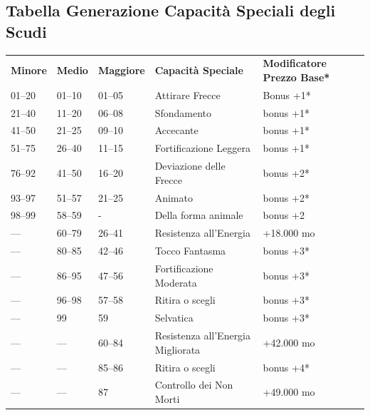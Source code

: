 \documentclass[a4paper,11pt,twoside,openany]{book}
\begin{document}
\subsection{Tabella Generazione Capacità Speciali degli Scudi}

\label{tabella-generazione-capacita-speciali-degli-scudi}


\begin{tabularx}{0.95\textwidth}{lllXX}
	\toprule
	\textbf{Minore} & \textbf{Medio} & \textbf{Maggiore} & \textbf{Capacità Speciale}        & \textbf{Modificatore Prezzo Base{*}}\\
	01--20          & 01--10         & 01--05            & Attirare Frecce   & Bonus +1{*}\\
	21--40          & 11--20         & 06--08            & Sfondamento       & bonus +1{*}\\
	41--50          & 21--25         & 09--10            & Accecante         & bonus +1{*}\\
	51--75          & 26--40         & 11--15            & Fortificazione Leggera            & bonus +1{*}\\
	76--92          & 41--50         & 16--20            & Deviazione delle Frecce           & bonus +2{*}\\
	93--97          & 51--57         & 21--25            & Animato           & bonus +2{*}\\
	98--99          & 58--59         & - & Della forma animale               & bonus +2\\
	---             & 60--79         & 26--41            & Resistenza all'Energia            & +18.000 mo\\
	---             & 80--85         & 42--46            & Tocco Fantasma    & bonus +3{*}\\
	---             & 86--95         & 47--56            & Fortificazione Moderata           & bonus +3{*}\\
	---             & 96--98         & 57--58            & Ritira o scegli   & bonus +3{*}\\
	---             & 99             & 59& Selvatica         & bonus +3{*}\\
	---             & ---            & 60--84            & Resistenza all'Energia Migliorata & +42.000 mo\\
	---             & ---            & 85--86            & Ritira o scegli   & bonus +4{*}\\
	---             & ---            & 87& Controllo dei Non Morti           & +49.000 mo\\

\end{tabularx}
\end{document}
